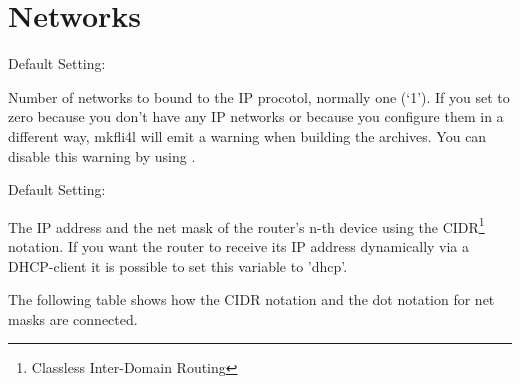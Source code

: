 
\section{Networks}

\begin{description}

  Default Setting: 
  
  {Number of networks to bound to the IP procotol, normally one (`1').
  If you set  to zero because you don't have any IP networks or
  because you configure them in a different way, mkfli4l will emit a warning
  when building the archives. You can disable this warning by using
  .}


  Default Setting: 

  {The IP address and the net mask of the router's n-th device using the
   CIDR\footnote{Classless Inter-Domain Routing} notation. If you want the
   router to receive its IP address dynamically via a DHCP-client it is possible
   to set this variable to 'dhcp'.

   The following table shows how the CIDR notation and the dot notation for
   net masks are connected.


}
\end{description}
